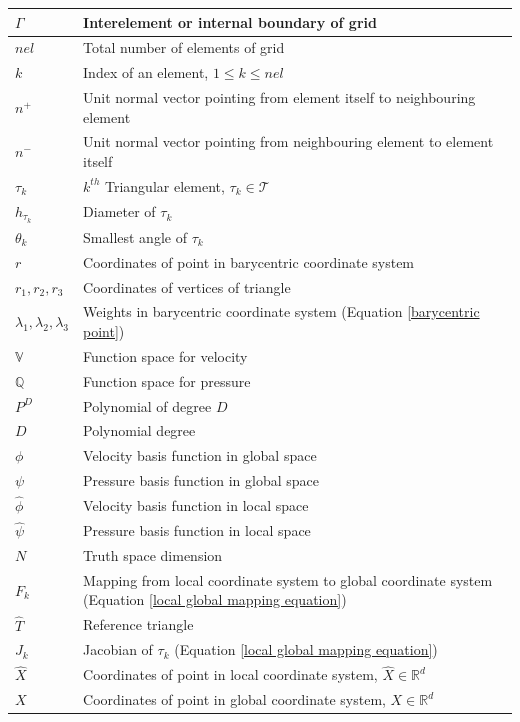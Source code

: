 \documentclass[a4paper,twoside,openright]{book}
\begin{document}
\begin{longtable}{| p{} | p{} |}
\hline
$\Gamma$ & Interelement or internal boundary of grid\\
\hline
$nel$ & Total number of elements of grid\\
\hline
$k$ & Index of an element, $1\leq k \leq nel$\\
\hline
$n^+$ & Unit normal vector pointing from element itself to neighbouring element\\
\hline
$n^-$ & Unit normal vector pointing from neighbouring element to element itself \\
\hline
$\tau_k$ & $k^{th}$ Triangular element, $\tau_k \in \mathcal{T}$\\
\hline
$h_{\tau_k}$ & Diameter of $\tau_k$\\
\hline
$\theta_k$ & Smallest angle of $\tau_k$\\ 
\hline
$r$ & Coordinates of point in barycentric coordinate system\\
\hline
$r_1, r_2, r_3$ & Coordinates of vertices of triangle\\
\hline
$\lambda_1, \lambda_2, \lambda_3$ & Weights in barycentric coordinate system (Equation \ref{barycentric point})\\
\hline
$\mathbb{V}$ & Function space for velocity\\
\hline
$\mathbb{Q}$ & Function space for pressure\\
\hline
$P^D$ & Polynomial of degree $D$\\
\hline
$D$ & Polynomial degree\\
\hline
$\phi$ & Velocity basis function in global space\\
\hline
$\psi$ & Pressure basis function in global space\\
\hline
$\hat{\phi}$ & Velocity basis function in local space\\
\hline
$\hat{\psi}$ & Pressure basis function in local space\\
\hline
$N$ & Truth space dimension\\
\hline
$F_k$ & Mapping from local coordinate system to global coordinate system (Equation \eqref{local global mapping equation})\\
\hline
$\hat{T}$ & Reference triangle\\
\hline
$J_k$ & Jacobian of $\tau_k$ (Equation \eqref{local global mapping equation})\\
\hline
$\hat{X}$ & Coordinates of point in local coordinate system, $\hat{X} \in \mathbb{R}^d$\\
\hline
$X$ & Coordinates of point in global coordinate system, $X \in \mathbb{R}^d$\\

\end{longtable}
\end{document}
